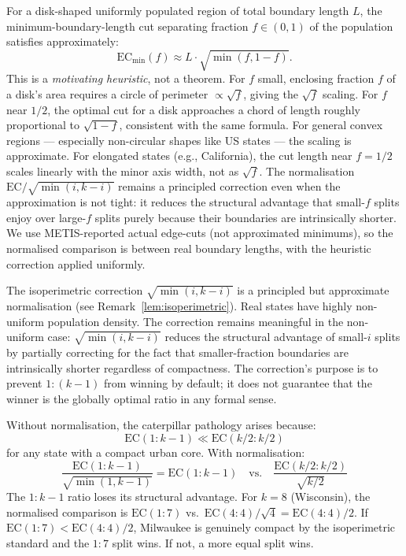 \begin{remark}
\label{lem:isoperimetric}
For a disk-shaped uniformly populated region of total boundary length $L$,
the minimum-boundary-length cut separating fraction $f \in (0,1)$ of the
population satisfies approximately:
\[
  \mathrm{EC}_{\min}(f) \approx L \cdot \sqrt{\min(f, 1-f)}.
\]
This is a \emph{motivating heuristic}, not a theorem.
For $f$ small, enclosing fraction $f$ of a disk's area requires a circle of
perimeter $\propto \sqrt{f}$, giving the $\sqrt{f}$ scaling.
For $f$ near $1/2$, the optimal cut for a disk approaches a chord of length
roughly proportional to $\sqrt{1-f}$, consistent with the same formula.
For general convex regions --- especially non-circular shapes like US states ---
the scaling is approximate.
For elongated states (e.g., California), the cut length near $f = 1/2$ scales
linearly with the minor axis width, not as $\sqrt{f}$.
The normalisation $\mathrm{EC}/\sqrt{\min(i,k-i)}$ remains a principled
correction even when the approximation is not tight: it reduces the structural
advantage that small-$f$ splits enjoy over large-$f$ splits purely because
their boundaries are intrinsically shorter.
We use METIS-reported actual edge-cuts (not approximated minimums), so the
normalised comparison is between real boundary lengths, with the heuristic
correction applied uniformly.
\end{remark}

\begin{remark}
The isoperimetric correction $\sqrt{\min(i,k-i)}$ is a principled but approximate
normalisation (see Remark~\ref{lem:isoperimetric}).
Real states have highly non-uniform population density.
The correction remains meaningful in the non-uniform case:
$\sqrt{\min(i,k-i)}$ reduces the structural advantage of small-$i$ splits by
partially correcting for the fact that smaller-fraction boundaries are intrinsically
shorter regardless of compactness.
The correction's purpose is to prevent $1:(k-1)$ from winning by default;
it does not guarantee that the winner is the globally optimal ratio in
any formal sense.
\end{remark}

Without normalisation, the caterpillar pathology arises because:
\[
  \mathrm{EC}(1:k-1) \ll \mathrm{EC}(k/2:k/2)
\]
for any state with a compact urban core.
With normalisation:
\[
  \frac{\mathrm{EC}(1:k-1)}{\sqrt{\min(1,k-1)}} = \mathrm{EC}(1:k-1)
  \quad\text{vs.}\quad
  \frac{\mathrm{EC}(k/2:k/2)}{\sqrt{k/2}}
\]
The $1:k-1$ ratio loses its structural advantage.
For $k=8$ (Wisconsin), the normalised comparison is
$\mathrm{EC}(1:7)$ vs.\ $\mathrm{EC}(4:4)/\sqrt{4} = \mathrm{EC}(4:4)/2$.
If $\mathrm{EC}(1:7) < \mathrm{EC}(4:4)/2$, Milwaukee is genuinely compact
by the isoperimetric standard and the $1:7$ split wins.
If not, a more equal split wins.

